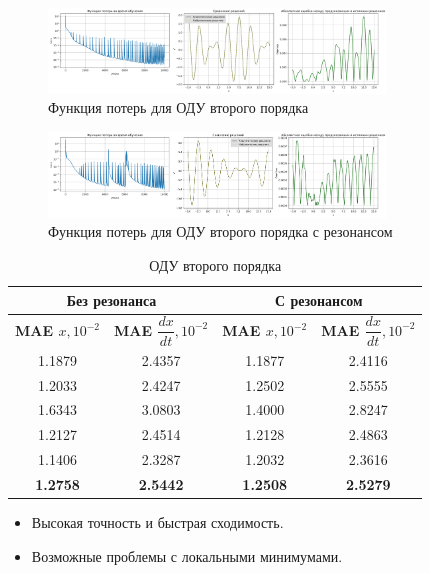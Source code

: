 \documentclass[12pt,a4paper]{article}
\begin{document}
\begin{figure}[H]
    \centering
    \includegraphics[width=0.8\textwidth]{images/Loss&x_ODE_of_the_second_order.png}
    \caption{Функция потерь для ОДУ второго порядка}
    \label{fig:loss_second_order}
\end{figure}

\begin{figure}[H]
    \centering
    \includegraphics[width=0.8\textwidth]{images/Loss&x_ODE_of_the_second_order_resonance.png}
    \caption{Функция потерь для ОДУ второго порядка с резонансом}
    \label{fig:loss_second_order_resonance}
\end{figure}

\begin{table}[h!]
    \centering
    \begin{tabular}{|c|c|c|c|}
    \hline
    \multicolumn{2}{|c|}{\textbf{Без резонанса}} & \multicolumn{2}{|c|}{\textbf{С резонансом}} \\
    \hline
    \textbf{MAE $x, 10^{-2}$} & \textbf{MAE $\dfrac{dx}{dt}, 10^{-2}$} & \textbf{MAE $x, 10^{-2}$} & \textbf{MAE $\dfrac{dx}{dt}, 10^{-2}$} \\
    \hline
    1.1879 & 2.4357 & 1.1877 & 2.4116 \\
    1.2033 & 2.4247 & 1.2502 & 2.5555 \\
    1.6343 & 3.0803 & 1.4000 & 2.8247 \\
    1.2127 & 2.4514 & 1.2128 & 2.4863 \\
    1.1406 & 2.3287 & 1.2032 & 2.3616 \\
    \hline
    \textbf{1.2758} & \textbf{2.5442} & \textbf{1.2508} & \textbf{2.5279} \\
    \hline
    \end{tabular}
    \caption{ОДУ второго порядка}
\end{table}

\begin{itemize}
    \item Высокая точность и быстрая сходимость.
    \item Возможные проблемы с локальными минимумами.
\end{itemize}
\end{document}
